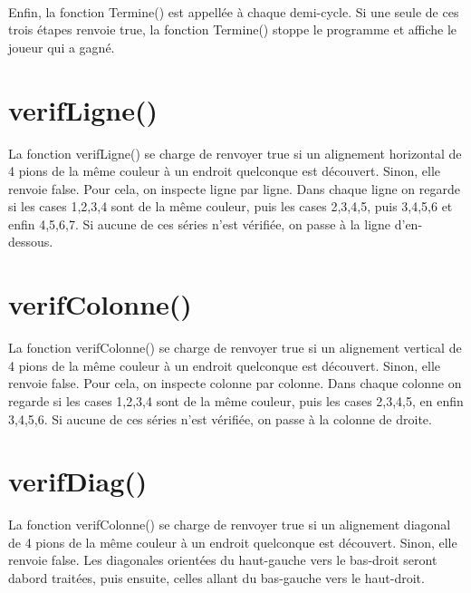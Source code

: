 \documentclass[a4paper]{report}
\begin{document}
\paragraph{}
Enfin, la fonction Termine() est appellée à chaque demi-cycle. Si une seule de ces trois étapes renvoie true, la fonction Termine() stoppe le programme et affiche le joueur qui a gagné.

\section*{verifLigne()}
La fonction verifLigne() se charge de renvoyer true si un alignement horizontal de 4 pions de la même couleur à un endroit quelconque est découvert. Sinon, elle renvoie false.
Pour cela, on inspecte ligne par ligne. Dans chaque ligne on regarde si les cases 1,2,3,4 sont de la même couleur, puis les cases 2,3,4,5, puis 3,4,5,6 et enfin 4,5,6,7. Si aucune de ces séries n'est vérifiée, on passe à la ligne d'en-dessous.

\section*{verifColonne()}
La fonction verifColonne() se charge de renvoyer true si un alignement vertical de 4 pions de la même couleur à un endroit quelconque est découvert. Sinon, elle renvoie false.
Pour cela, on inspecte colonne par colonne. Dans chaque colonne on regarde si les cases 1,2,3,4 sont de la même couleur, puis les cases 2,3,4,5, en enfin 3,4,5,6. Si aucune de ces séries n'est vérifiée, on passe à la colonne de droite.

\section*{verifDiag()}
La fonction verifColonne() se charge de renvoyer true si un alignement diagonal de 4 pions de la même couleur à un endroit quelconque est découvert. Sinon, elle renvoie false.
Les diagonales orientées du haut-gauche vers le bas-droit seront dabord traitées, puis ensuite, celles allant du bas-gauche vers le haut-droit.
\end{document}
